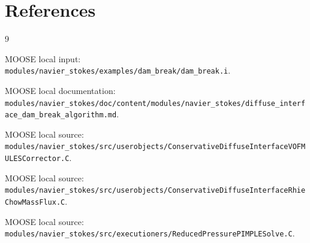 \documentclass[11pt]{article}
\begin{document}
\section{References}

\begin{thebibliography}{9}

MOOSE local input:
\texttt{modules/navier\_stokes/examples/dam\_break/dam\_break.i}.

MOOSE local documentation:
\texttt{modules/navier\_stokes/doc/content/modules/navier\_stokes/diffuse\_interface\_dam\_break\_algorithm.md}.

MOOSE local source:
\texttt{modules/navier\_stokes/src/userobjects/ConservativeDiffuseInterfaceVOFMULESCorrector.C}.

MOOSE local source:
\texttt{modules/navier\_stokes/src/userobjects/ConservativeDiffuseInterfaceRhieChowMassFlux.C}.

MOOSE local source:
\texttt{modules/navier\_stokes/src/executioners/ReducedPressurePIMPLESolve.C}.

\end{thebibliography}
\end{document}
